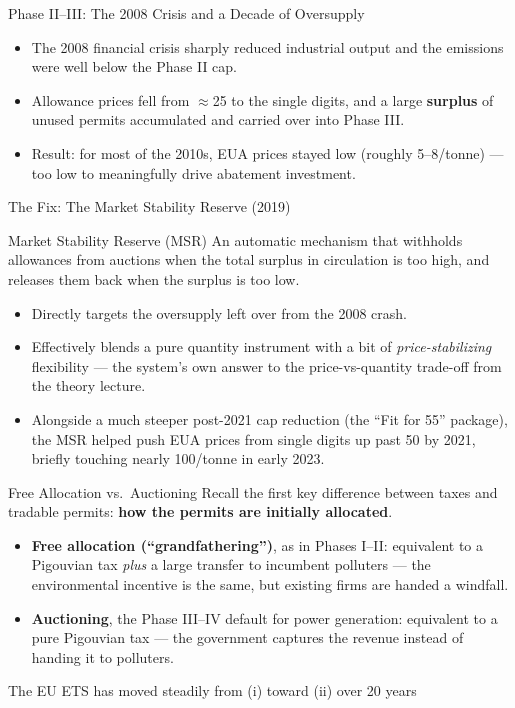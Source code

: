 \documentclass[11pt,aspectratio=169]{beamer}
\begin{document}
\begin{frame}{Phase II--III: The 2008 Crisis and a Decade of Oversupply}
	\begin{itemize}
		\item The 2008 financial crisis sharply reduced industrial output and the emissions were well below the Phase II cap.
		\item Allowance prices fell from $\approx$\texteuro{}25 to the single digits, and a large \textbf{surplus} of unused permits accumulated and carried over into Phase III.
		\item Result: for most of the 2010s, EUA prices stayed low (roughly \texteuro{}5--8/tonne) --- too low to meaningfully drive abatement investment.
	\end{itemize}

\end{frame}

\begin{frame}{The Fix: The Market Stability Reserve (2019)}
	\begin{block}{Market Stability Reserve (MSR)}
		An automatic mechanism that withholds allowances from auctions when the total surplus in circulation is too high, and releases them back when the surplus is too low.
	\end{block}
	\begin{itemize}
		\item Directly targets the oversupply left over from the 2008 crash.
		\item Effectively blends a pure quantity instrument with a bit of \emph{price-stabilizing} flexibility --- the system's own answer to the price-vs-quantity trade-off from the theory lecture.
		\item Alongside a much steeper post-2021 cap reduction (the ``Fit for 55'' package), the MSR helped push EUA prices from single digits up past \texteuro{}50 by 2021, briefly touching nearly \texteuro{}100/tonne in early 2023.
	\end{itemize}
\end{frame}

\begin{frame}{Free Allocation vs.\ Auctioning}
	Recall the first key difference between taxes and tradable permits: \textbf{how the permits are initially allocated}.
	\begin{itemize}
		\item \textbf{Free allocation (``grandfathering'')}, as in Phases I--II: equivalent to a Pigouvian tax \emph{plus} a large transfer to incumbent polluters --- the environmental incentive is the same, but existing firms are handed a windfall.
		\item \textbf{Auctioning}, the Phase III--IV default for power generation: equivalent to a pure Pigouvian tax --- the government captures the revenue instead of handing it to polluters.
	\end{itemize}
	\small The EU ETS has moved steadily from (i) toward (ii) over 20 years
\end{frame}
\end{document}
